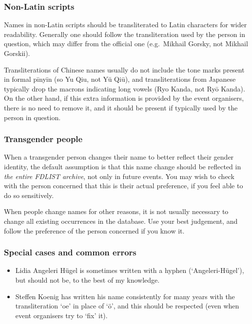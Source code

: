 \documentclass[12pt]{scrartcl}
\theoremstyle{definition}
\begin{document}
\subsubsection{Non-Latin scripts}
Names in non-Latin scripts should be transliterated to Latin characters for wider readability.
Generally one should follow the transliteration used by the person in question, which may differ from the official one (e.g.\ Mikhail Gorsky, not Mikhail Gorskii).

Transliterations of Chinese names usually do not include the tone marks present in formal pīnyīn (so Yu Qiu, not Yŭ Qiū), and transliterations from Japanese typically drop the macrons indicating long vowels (Ryo Kanda, not Ryō Kanda).
On the other hand, if this extra information is provided by the event organisers, there is no need to remove it, and it should be present if typically used by the person in question.

\subsubsection{Transgender people}
When a transgender person changes their name to better reflect their gender identity, the default assumption is that this name change should be reflected in \emph{the entire FDLIST archive}, not only in future events.
You may wish to check with the person concerned that this is their actual preference, if you feel able to do so sensitively.

When people change names for other reasons, it is not usually necessary to change all existing occurrences in the database.
Use your best judgement, and follow the preference of the person concerned if you know it.

\subsubsection{Special cases and common errors}
\begin{itemize}
\item Lidia Angeleri Hügel is sometimes written with a hyphen (`Angeleri-Hügel'), but should not be, to the best of my knowledge.
\item Steffen Koenig has written his name consistently for many years with the transliteration `oe' in place of `ö', and this should be respected (even when event organisers try to `fix' it).
\end{itemize}
\end{document}
